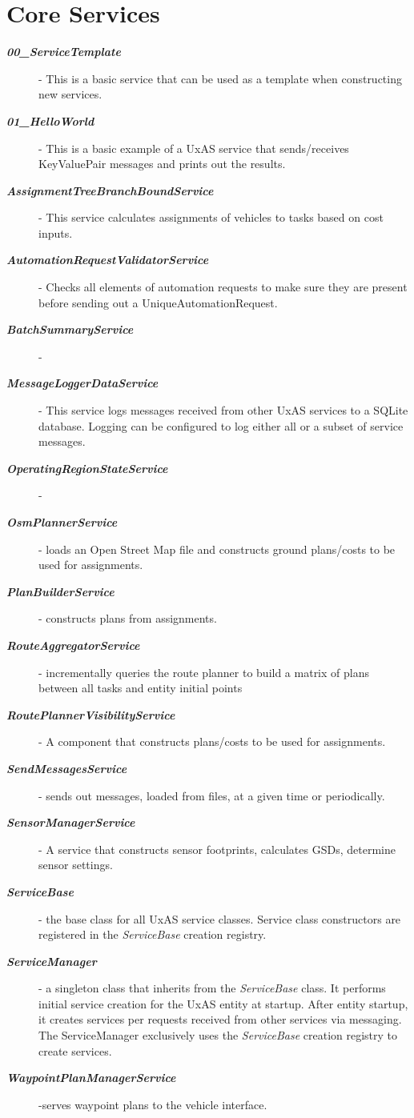 \section{Core Services}
\begin{description}
	\item[\textbf{\textit{00\_ServiceTemplate}}] - This is a basic service that can be used as a template when constructing new services.
	\item[\textbf{\textit{01\_HelloWorld}}] - This is a basic example of a UxAS service that sends/receives KeyValuePair messages and prints out the results.
	\item[\textbf{\textit{AssignmentTreeBranchBoundService}}] - This service calculates assignments of vehicles to tasks based on cost inputs. 
	\item[\textbf{\textit{AutomationRequestValidatorService}}] - Checks all elements of automation requests to make sure they are present before sending out a UniqueAutomationRequest. 
	\item[\textbf{\textit{BatchSummaryService}}] - 
	\item[\textbf{\textit{MessageLoggerDataService}}] - This service logs messages received from other UxAS services to a SQLite database.  Logging can be configured to log either all or a subset of service messages.
	\item[\textbf{\textit{OperatingRegionStateService}}] - 
	\item[\textbf{\textit{OsmPlannerService}}] - loads an Open Street Map file and constructs ground plans/costs to be used for assignments.
	\item[\textbf{\textit{PlanBuilderService}}] - constructs plans from assignments. 
	\item[\textbf{\textit{RouteAggregatorService}}] - incrementally queries the route planner to build a matrix of plans between all tasks and entity initial points 
	\item[\textbf{\textit{RoutePlannerVisibilityService}}] - A component that constructs plans/costs to be used for assignments.
	\item[\textbf{\textit{SendMessagesService}}] - sends out messages, loaded from files, at a given time or periodically.
	\item[\textbf{\textit{SensorManagerService}}] - A service that constructs sensor footprints, calculates GSDs, determine sensor settings.
	\item[\textbf{\textit{ServiceBase}}] - the base class for all UxAS service classes. Service class constructors are registered in the \textit{ServiceBase} creation registry.
	\item[\textbf{\textit{ServiceManager}}] - a singleton class that inherits from the  \textit{ServiceBase}  class. It performs initial service creation for the UxAS entity at startup. After entity startup, it creates services per requests received from other services via messaging.  The ServiceManager  exclusively uses the  \textit{ServiceBase} creation registry to create services.
	\item[\textbf{\textit{WaypointPlanManagerService}}] -serves waypoint plans to the vehicle interface.
\end{description}

